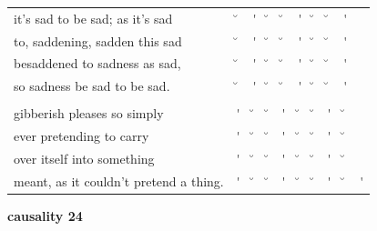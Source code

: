\documentclass[12pt, landscape]{article}
\begin{document}
\begin{center}
\begin{tabularx}{\textwidth}{
>{\lefting\arraybackslash}X
c
c
c
c
c
c
c
c
c
}

it's sad to be sad; as it's sad & \u{} & \'{} & \u{} & \u{} & \'{} & \u{} & \u{} & \'{} & \\
to, saddening, sadden this sad & \u{} & \'{} & \u{} & \u{} & \'{} & \u{} & \u{} & \'{} & \\
besaddened to sadness as sad, & \u{} & \'{} & \u{} & \u{} & \'{} & \u{} & \u{} & \'{} & \\
so sadness be sad to be sad. & \u{} & \'{} & \u{} & \u{} & \'{} & \u{} & \u{} & \'{} & \\
 & & & & & & & & \\
gibberish pleases so simply & \'{} & \u{} & \u{} & \'{} & \u{} & \u{} & \'{} & \u{} & \\
ever pretending to carry & \'{} & \u{} & \u{} & \'{} & \u{} & \u{} & \'{} & \u{} & \\
over itself into something & \'{} & \u{} & \u{} & \'{} & \u{} & \u{} & \'{} & \u{} & \\
meant, as it couldn't pretend a thing. & \'{} & \u{} & \u{} & \'{} & \u{} & \u{} & \'{} & \u{} & \'{} \\

\end{tabularx}
\end{center}

\vspace*{\fill}

\newpage

\vspace*{\fill}

\noindent \textbf{causality 24}
\noindent \hfill \par
\end{document}
